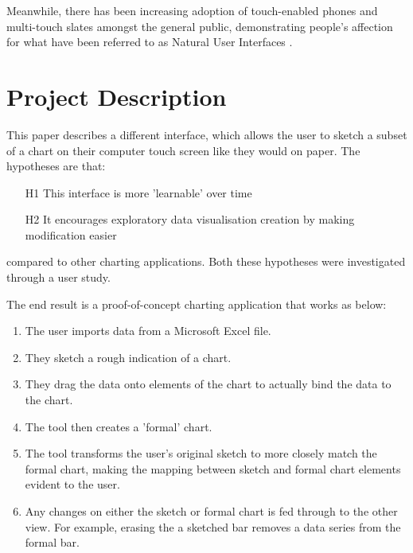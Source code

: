 Meanwhile, there has been increasing adoption of touch-enabled phones and multi-touch slates amongst the general public, demonstrating people's affection for what have been referred to as Natural User Interfaces \cite{lee_beyond_2012}.


\section{Project Description}
This paper describes a different interface, which allows the user to sketch a subset of a chart on their computer touch screen like they would on paper. The hypotheses are that:

\begin{enumerate}
\item[H1] This interface is more 'learnable' over time
\item[H2] It encourages exploratory data visualisation creation by making modification easier
\end{enumerate}

compared to other charting applications. Both these hypotheses were investigated through a user study.


The end result is a proof-of-concept charting application that works as below:
\begin{enumerate}
\item The user imports data from a Microsoft Excel file.
\item They sketch a rough indication of a chart.
\item They drag the data onto elements of the chart to actually bind the data to the chart. 
\item The tool then creates a 'formal' chart.
\item The tool transforms the user's original sketch to more closely match the formal chart, making the mapping between sketch and formal chart elements evident to the user.
\item Any changes on either the sketch or formal chart is fed through to the other view. For example, erasing the a sketched bar removes a data series from the formal bar.
\end{enumerate}

